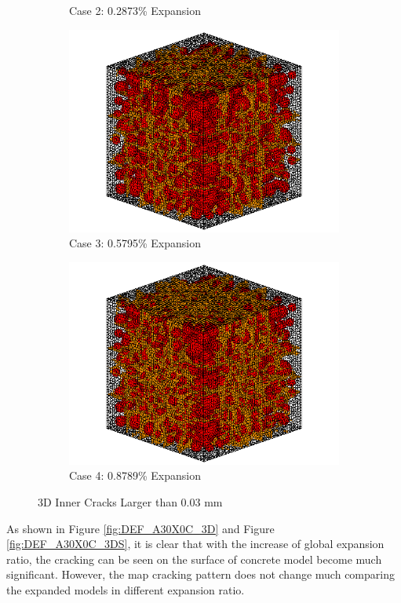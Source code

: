 \begin{figure}[!h]
\begin{subfigure}{.5\textwidth}
    \caption{Case 2: 0.2873\% Expansion}
    \end{subfigure}%
    \begin{subfigure}{.5\textwidth}
      \centering
      \includegraphics[width=.8\linewidth]{Files/exp_3D/DEF/A30X0C_3_c.png}
    \caption{Case 3: 0.5795\% Expansion}
    \end{subfigure}
    \begin{subfigure}{.5\textwidth}
      \centering
      \includegraphics[width=.8\linewidth]{Files/exp_3D/DEF/A30X0C_4_c.png}
    \caption{Case 4: 0.8789\% Expansion}
    \end{subfigure}%

  \caption{3D Inner Cracks Larger than 0.03 mm}
  \label{fig:DEF_A30X0C_crack}
\end{figure}

As shown in Figure \ref{fig:DEF_A30X0C_3D} and Figure \ref{fig:DEF_A30X0C_3DS}, it is clear that with the increase of global expansion ratio, the cracking can be seen on the surface of concrete model become much significant. However, the map cracking pattern does not change much comparing the expanded models in different expansion ratio.

